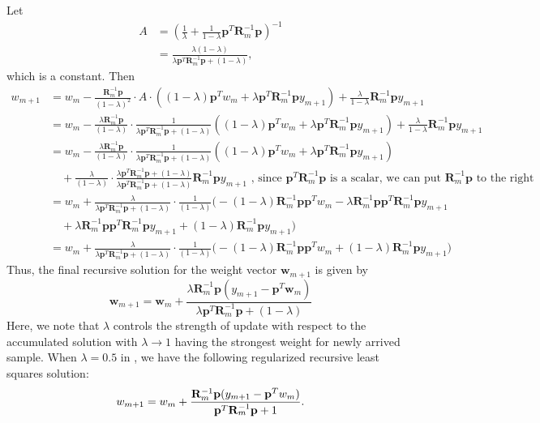 Let 
\begin{align*}
	A &= \left( \frac{1}{\lambda} + \frac{1}{1 - \lambda} \mathbf{p}^T \mathbf{R}_m^{-1} \mathbf{p} \right)^{-1} \\
	  &= \frac{\lambda(1-\lambda)}{\lambda \mathbf{p}^T \mathbf{R}_m^{-1} \mathbf{p}+(1-\lambda)},
\end{align*}
which is a constant. Then 
\begin{align*}
	w_{m+1} &= w_m - \frac{\mathbf{R}_m^{-1} \mathbf{p}}{(1-\lambda)^2} \cdot A \cdot \left((1-\lambda)\mathbf{p}^T w_m + \lambda \mathbf{p}^T \mathbf{R}_m^{-1}\mathbf{p} y_{m+1}\right)+ \frac{\lambda}{1 - \lambda} \mathbf{R}_m^{-1} \mathbf{p} y_{m+1}\\
			&= w_m - \frac{\lambda \mathbf{R}_m^{-1} \mathbf{p}}{(1-\lambda)} \cdot \frac{1}{\lambda \mathbf{p}^T \mathbf{R}_m^{-1} \mathbf{p}+(1-\lambda)}\left((1-\lambda)\mathbf{p}^T w_m + \lambda \mathbf{p}^T \mathbf{R}_m^{-1}\mathbf{p} y_{m+1}\right) + \frac{\lambda}{1 - \lambda} \mathbf{R}_m^{-1} \mathbf{p} y_{m+1}\\
			&= w_m - \frac{\lambda \mathbf{R}_m^{-1} \mathbf{p}}{(1-\lambda)} \cdot \frac{1}{\lambda \mathbf{p}^T \mathbf{R}_m^{-1} \mathbf{p}+(1-\lambda)}\left((1-\lambda)\mathbf{p}^T w_m + \lambda \mathbf{p}^T \mathbf{R}_m^{-1}\mathbf{p} y_{m+1}\right) \\ 
			&\quad +\frac{\lambda}{(1 - \lambda)}\cdot \frac{\lambda \mathbf{p}^T \mathbf{R}_m^{-1} \mathbf{p}+(1-\lambda)}{\lambda \mathbf{p}^T \mathbf{R}_m^{-1} \mathbf{p}+(1-\lambda)} \mathbf{R}_m^{-1} \mathbf{p} y_{m+1} \,\, \text{, since $\mathbf{p}^T \mathbf{R}_m^{-1} \mathbf{p}$ is a scalar, we can put $\mathbf{R}_m^{-1} \mathbf{p}$ to the right}\\
			&= w_m + \frac{\lambda}{\lambda \mathbf{p}^T \mathbf{R}_m^{-1} \mathbf{p}+(1-\lambda)}\cdot\frac{1}{(1-\lambda)}\big(-(1-\lambda)\mathbf{R}_m^{-1}\mathbf{p}\mathbf{p}^T w_m - \lambda \mathbf{R}_m^{-1}\mathbf{p}\mathbf{p}^T\mathbf{R}_m^{-1}\mathbf{p}y_{m+1}\\
			&\quad + \lambda \mathbf{R}_m^{-1}\mathbf{p}\mathbf{p}^T\mathbf{R}_m^{-1}\mathbf{p}y_{m+1} + (1-\lambda)\mathbf{R}_m^{-1}\mathbf{p}y_{m+1}\big)\\
			&= w_m + \frac{\lambda}{\lambda \mathbf{p}^T \mathbf{R}_m^{-1} \mathbf{p}+(1-\lambda)}\cdot\frac{1}{(1-\lambda)}\big(-(1-\lambda)\mathbf{R}_m^{-1}\mathbf{p}\mathbf{p}^T w_m + (1-\lambda)\mathbf{R}_m^{-1}\mathbf{p}y_{m+1}\big)
\end{align*}
Thus, the final recursive solution for the weight vector \(\mathbf{w}_{m+1}\) is given by
\[
\mathbf{w}_{m+1} = \mathbf{w}_m + \frac{\lambda \mathbf{R}_m^{-1} \mathbf{p} (y_{m+1} - \mathbf{p}^T \mathbf{w}_m)}{\lambda \mathbf{p}^T \mathbf{R}_m^{-1} \mathbf{p} + (1 - \lambda)}
\]
Here, we note that $\lambda$ controls the strength of update with respect to the accumulated solution with $\lambda \to 1$ having the strongest weight for newly arrived sample. When $\lambda = 0.5$ in , we have the following regularized recursive least squares solution:
\begin{align*}
	w_{m+1} = w_m + \frac{\mathbf{R}_m^{-1} {\mathbf{p}} (y_{m+1} - {\mathbf{p}}^T w_m)}{{\mathbf{p}}^T \mathbf{R}_m^{-1} {\mathbf{p}} + 1}. 
\end{align*}

